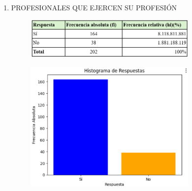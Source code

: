 \documentclass[12pt, a4paper]{article}
\begin{document}
\begin{enumerate}
\begin{enumerate}
        \item PROFESIONALES QUE EJERCEN SU PROFESIÓN
        \begin{figure}[H]
            \begin{center}
                \includegraphics[width=0.80\textwidth]{images/empleo2.png}
            \end{center}
            \label{fig:empleo2}
        \end{figure}
        \begin{figure}[H]
            \begin{center}
                \includegraphics[width=0.80\textwidth]{images/ejercenHist.png}
            \end{center}
            \label{fig:ejercenHist}
        \end{figure}


\end{enumerate}
\end{enumerate}
\end{document}
